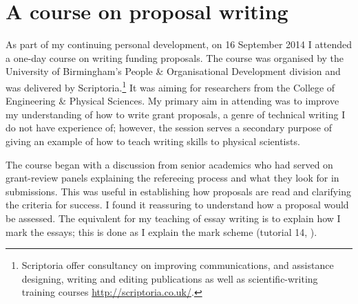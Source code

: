 \chapter{A course on proposal writing}\label{ap:Scriptoria}

As part of my continuing personal development, on 16 September 2014 I attended a one-day course on writing funding proposals. The course was organised by the University of Birmingham's People \& Organisational Development division and was delivered by Scriptoria.\footnote{Scriptoria offer consultancy on improving communications, and assistance designing, writing and editing publications as well as scientific-writing training courses \url{http://scriptoria.co.uk/}.} It was aiming for researchers from the College of Engineering \& Physical Sciences. My primary aim in attending was to improve my understanding of how to write grant proposals, a genre of technical writing I do not have experience of; however, the session serves a secondary purpose of giving an example of how to teach writing skills to physical scientists.

The course began with a discussion from senior academics who had served on grant-review panels explaining the refereeing process and what they look for in submissions. This was useful in establishing how proposals are read and clarifying the criteria for success. I found it reassuring to understand how a proposal would be assessed. The equivalent for my teaching of essay writing is to explain how I mark the essays; this is done as I explain the mark scheme (tutorial 14, ).

